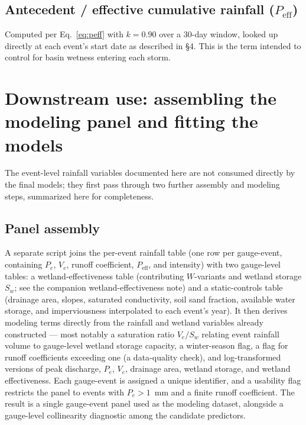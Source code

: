 \documentclass[11pt]{article}
\begin{document}
\subsection{Antecedent / effective cumulative rainfall ($P_{\text{eff}}$)}
Computed per Eq.~\eqref{eq:peff} with $k=0.90$ over a 30-day window, looked up directly at each
event's start date as described in \S4. This is the term intended to control for basin wetness
entering each storm.

\section{Downstream use: assembling the modeling panel and fitting the models}

The event-level rainfall variables documented here are not consumed directly by the final
models; they first pass through two further assembly and modeling steps, summarized here for
completeness.

\subsection{Panel assembly}
A separate script joins the per-event rainfall table (one row per gauge-event, containing $P_e$,
$V_e$, runoff coefficient, $P_{\text{eff}}$, and intensity) with two gauge-level tables: a
wetland-effectiveness table (contributing $W$-variants and wetland storage $S_w$; see the
companion wetland-effectiveness note) and a static-controls table (drainage area, slopes,
saturated conductivity, soil sand fraction, available water storage, and imperviousness
interpolated to each event's year). It then derives modeling terms directly from the rainfall
and wetland variables already constructed --- most notably a saturation ratio $V_e/S_w$ relating
event rainfall volume to gauge-level wetland storage capacity, a winter-season flag, a flag for
runoff coefficients exceeding one (a data-quality check), and log-transformed versions of peak
discharge, $P_e$, $V_e$, drainage area, wetland storage, and wetland effectiveness. Each
gauge-event is assigned a unique identifier, and a usability flag restricts the panel to events
with $P_e > 1$~mm and a finite runoff coefficient. The result is a single gauge-event panel used
as the modeling dataset, alongside a gauge-level collinearity diagnostic among the candidate
predictors.
\end{document}
